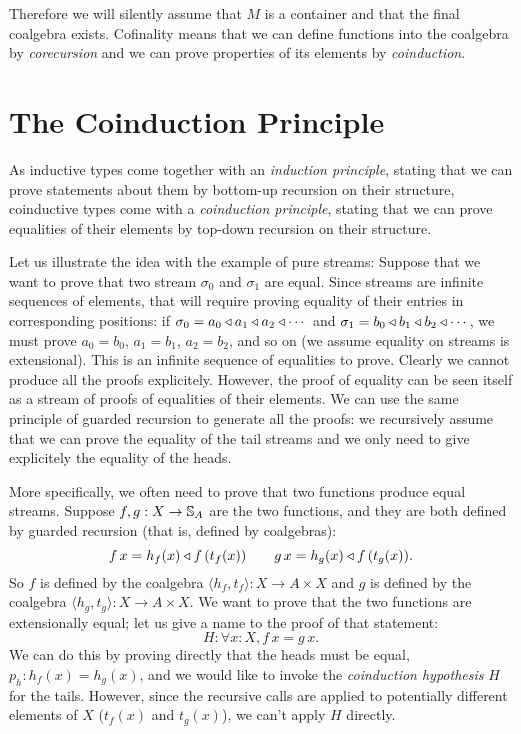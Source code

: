 \documentclass{article}
\begin{document}
Therefore we will silently assume that $M$ is a container and that the final coalgebra exists.
Cofinality means that we can define functions into the coalgebra by {\em corecursion} and we can prove properties of its elements by {\em coinduction}.

\section{The Coinduction Principle}

As inductive types come together with an {\em induction principle}, stating that we can prove statements about them by bottom-up recursion on their structure, coinductive types come with a {\em coinduction principle}, stating that we can prove equalities of their elements by top-down recursion on their structure.

Let us illustrate the idea with the example of pure streams:
Suppose that we want to prove that two stream $\sigma_0$ and $\sigma_1$ are equal.
Since streams are infinite sequences of elements, that will require proving equality of their entries in corresponding positions: if $\sigma_0 = a_0\triangleleft a_1\triangleleft a_2\triangleleft \cdots$ and  $\sigma_1 = b_0\triangleleft b_1\triangleleft b_2\triangleleft \cdots$, we must prove $a_0 = b_0$, $a_1 = b_1$, $a_2=b_2$, and so on (we assume equality on streams is extensional).
This is an infinite sequence of equalities to prove.
Clearly we cannot produce all the proofs explicitely.
However, the proof of equality can be seen itself as a stream of proofs of equalities of their elements.
We can use the same principle of guarded recursion to generate all the proofs: we recursively assume that we can prove the equality of the tail streams and we only need to give explicitely the equality of the heads.

More specifically, we often need to prove that two functions produce equal streams.
Suppose $f,g:X \rightarrow \mathbb{S}_{A}$ are the two functions, and they are both defined by guarded recursion (that is, defined by coalgebras):
$$
f\,x = h_f(x) \triangleleft f\,(t_f(x)) \qquad g\,x = h_g(x) \triangleleft f\,(t_g(x)).
$$
So $f$ is defined by the coalgebra $\langle h_f, t_f\rangle : X \rightarrow A\times X$ and $g$ is defined by the coalgebra $\langle h_g, t_g\rangle : X \rightarrow A\times X$.
We want to prove that the two functions are extensionally equal; let us give a name to the proof of that statement:
$$
H: \forall x:X, f\,x = g\,x.
$$
We can do this by proving directly that the heads must be equal, $p_h:h_f(x) = h_g(x)$, and we would like to invoke the {\em coinduction hypothesis} $H$ for the tails.
However, since the recursive calls are applied to potentially different elements of $X$ ($t_f(x)$ and $t_g(x)$), we can't apply $H$ directly.
\end{document}
